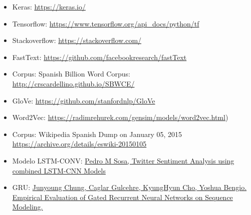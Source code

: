 \documentclass[11pt]{article}
\begin{document}
\begin{itemize}
    \item Keras: \href{https://keras.io/}{https://keras.io/}
    \item Tensorflow: \href{https://www.tensorflow.org/api_docs/python/tf}{https://www.tensorflow.org/api\_docs/python/tf}
    \item Stackoverflow: \href{https://stackoverflow.com/}{https://stackoverflow.com/}
    \item FastText: \href{https://github.com/facebookresearch/fastText}{https://github.com/facebookresearch/fastText}
    \item Corpus: Spanish Billion Word Corpus: \href{http://crscardellino.github.io/SBWCE/}{http://crscardellino.github.io/SBWCE/}
    \item GloVe: \href{https://github.com/stanfordnlp/GloVe}{https://github.com/stanfordnlp/GloVe}
    \item Word2Vec: \href{https://radimrehurek.com/gensim/models/word2vec.html}{https://radimrehurek.com/gensim/models/word2vec.html})
    \item Corpus: Wikipedia Spanish Dump on January 05, 2015 \href{https://archive.org/details/eswiki-20150105}{https://archive.org/details/eswiki-20150105}
    \item Modelo LSTM-CONV: \href {https://www.academia.edu/35947062/Twitter_Sentiment_Analysis_using_combined_LSTM-CNN_Models}{Pedro M Sosa, Twitter Sentiment Analysis using combined LSTM-CNN Models}
    \item GRU: \href{https://arxiv.org/pdf/1412.3555v1.pdf}{Junyoung Chung, Caglar Gulcehre, KyungHyun Cho, Yoshua Bengio. Empirical Evaluation of Gated Recurrent Neural Networks on Sequence Modeling.}
\end{itemize}
\end{document}
